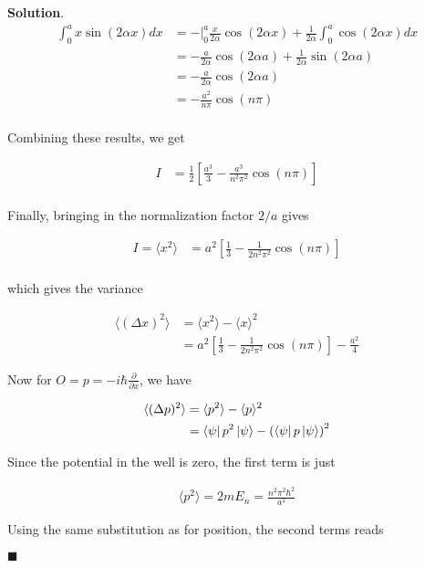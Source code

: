 \documentclass[12pt]{article}
\theoremstyle{definition}
\newenvironment{s}{%
        \begin{trivlist} \item \textbf{Solution}. }{%
            \hspace*{\fill} $\blacksquare$\end{trivlist}}%
\begin{document}
{\begin{s}
\begin{align*}
\int_{0}^{a} x\sin(2\alpha x)dx &= -\bigg\rvert_{0}^{a} \frac{x}{2\alpha}\cos(2\alpha x) + \frac{1}{2\alpha}\int_{0}^{a} \cos(2\alpha x)dx\\
&= -\frac{a}{2\alpha}\cos(2\alpha a) + \frac{1}{2\alpha}\sin(2\alpha a)\\
&= -\frac{a}{2\alpha}\cos(2\alpha a)\\
&= -\frac{a^{2}}{n\pi}\cos(n\pi)\\
\end{align*}

Combining these results, we get

\begin{align*}
I &= \frac{1}{2}\left[\frac{a^{3}}{3} - \frac{a^{3}}{n^{2}\pi^{2}}\cos(n\pi)\right]\\
\end{align*}

Finally, bringing in the normalization factor $2/a$ gives

\begin{align*}
I = \langle x^{2} \rangle &= a^{2}\left[\frac{1}{3} - \frac{1}{2 n^{2}\pi^{2}}\cos(n\pi)\right]\\
\end{align*}

which gives the variance 

\begin{align*}
\langle (\Delta x)^{2}\rangle &= \langle x^{2} \rangle - \langle x\rangle^{2}\\
&= a^{2}\left[\frac{1}{3} - \frac{1}{2 n^{2}\pi^{2}}\cos(n\pi)\right] - \frac{a^{2}}{4}
\end{align*}

Now for $O = p = -i\hbar\frac{\partial}{\partial x}$, we have

\begin{align*}
\langle (\Delta p)^{2}\rangle &= \langle p^{2} \rangle - \langle p\rangle^{2}\\
&= \bra{\psi} p^{2} \ket{\psi} - \left(\bra{\psi} p \ket{\psi}\right)^{2}\\
\end{align*}

Since the potential in the well is zero, the first term is just

\begin{align*}
\langle p^{2} \rangle = 2mE_{n} = \frac{n^{2}\pi^{2}\hbar^{2}}{a^{2}}
\end{align*}

Using the same substitution as for position, the second terms reads


\end{s}}
\end{document}
